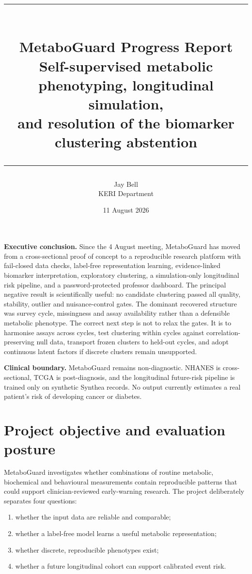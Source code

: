 \documentclass[11pt,a4paper]{article}
\title{\vspace{-1.2cm}
  {\color{MGTealDark}\rule{\textwidth}{1.3pt}}\\[0.6cm]
  {\LARGE\bfseries MetaboGuard Progress Report}\\[0.25cm]
  {\large Self-supervised metabolic phenotyping, longitudinal simulation,\\
  and resolution of the biomarker clustering abstention}\\[0.6cm]
  {\color{MGTealDark}\rule{\textwidth}{0.5pt}}
}
\author{Jay Bell\\KERI Department}
\date{11 August 2026}
\begin{document}
\maketitle
\thispagestyle{empty}

\begin{summarybox}
\textbf{Executive conclusion.}
Since the 4 August meeting, MetaboGuard has moved from a cross-sectional proof of
concept to a reproducible research platform with fail-closed data checks,
label-free representation learning, evidence-linked biomarker interpretation,
exploratory clustering, a simulation-only longitudinal risk pipeline, and a
password-protected professor dashboard. The principal negative result is
scientifically useful: no candidate clustering passed all quality, stability,
outlier and nuisance-control gates. The dominant recovered structure was survey
cycle, missingness and assay availability rather than a defensible metabolic
phenotype. The correct next step is not to relax the gates. It is to harmonise
assays across cycles, test clustering within cycles against correlation-preserving
null data, transport frozen clusters to held-out cycles, and adopt continuous
latent factors if discrete clusters remain unsupported.
\end{summarybox}

\begin{warningbox}
\textbf{Clinical boundary.}
MetaboGuard remains non-diagnostic. NHANES is cross-sectional, TCGA is
post-diagnosis, and the longitudinal future-risk pipeline is trained only on
synthetic Synthea records. No output currently estimates a real patient's risk of
developing cancer or diabetes.
\end{warningbox}

\tableofcontents
\newpage

\section{Project objective and evaluation posture}

MetaboGuard investigates whether combinations of routine metabolic, biochemical
and behavioural measurements contain reproducible patterns that could support
clinician-reviewed early-warning research. The project deliberately separates
four questions:

\begin{enumerate}
  \item whether the input data are reliable and comparable;
  \item whether a label-free model learns a useful metabolic representation;
  \item whether discrete, reproducible phenotypes exist;
  \item whether a future longitudinal cohort can support calibrated event risk.
\end{enumerate}
\end{document}
